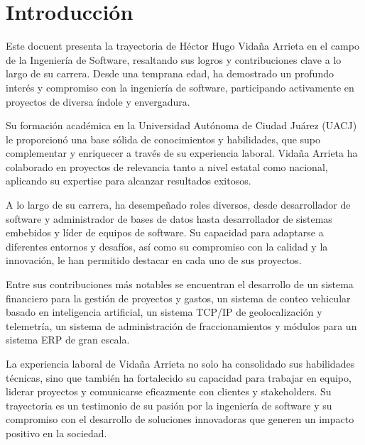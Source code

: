 \documentclass[final, fmstyle, 12pt]{article}
\begin{document}
\section{Introducción}
\setlength{\parskip}{1em} 
Este docuent presenta la trayectoria de Héctor Hugo Vidaña Arrieta en el campo de la Ingeniería de Software, resaltando sus logros y contribuciones clave a lo largo de su carrera. Desde una temprana edad, ha demostrado un profundo interés y compromiso con la ingeniería de software, participando activamente en proyectos de diversa índole y envergadura.

Su formación académica en la Universidad Autónoma de Ciudad Juárez (UACJ) le proporcionó una base sólida de conocimientos y habilidades, que supo complementar y enriquecer a través de su experiencia laboral. Vidaña Arrieta ha colaborado en proyectos de relevancia tanto a nivel estatal como nacional, aplicando su expertise para alcanzar resultados exitosos.

A lo largo de su carrera, ha desempeñado roles diversos, desde desarrollador de software y administrador de bases de datos hasta desarrollador de sistemas embebidos y líder de equipos de software. Su capacidad para adaptarse a diferentes entornos y desafíos, así como su compromiso con la calidad y la innovación, le han permitido destacar en cada uno de sus proyectos.

Entre sus contribuciones más notables se encuentran el desarrollo de un sistema financiero para la gestión de proyectos y gastos, un sistema de conteo vehicular basado en inteligencia artificial, un sistema TCP/IP de geolocalización y telemetría, un sistema de administración de fraccionamientos y módulos para un sistema ERP de gran escala.

La experiencia laboral de Vidaña Arrieta no solo ha consolidado sus habilidades técnicas, sino que también ha fortalecido su capacidad para trabajar en equipo, liderar proyectos y comunicarse eficazmente con clientes y stakeholders. Su trayectoria es un testimonio de su pasión por la ingeniería de software y su compromiso con el desarrollo de soluciones innovadoras que generen un impacto positivo en la sociedad.
\end{document}
